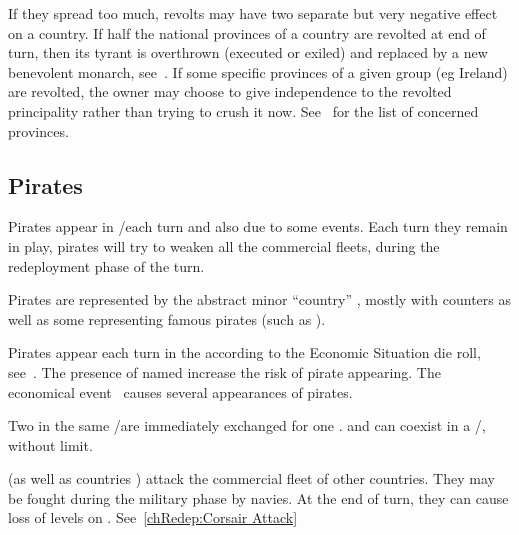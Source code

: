  If they spread too much, revolts may have two
separate but very negative effect on a country.
\bparag If half the national provinces of a country are revolted at end of
turn, then its tyrant is overthrown (executed or exiled) and replaced by a new
benevolent monarch, see~.
\bparag If some specific provinces of a given group (eg Ireland) are revolted,
the owner may choose to give independence to the revolted principality rather
than trying to crush it now. See~ for the list of concerned provinces.



\subsection{Pirates}

Pirates appear in \STZ/\CTZ each turn and also due to some events. Each turn
they remain in play, pirates will try to weaken all the commercial fleets,
during the redeployment phase of the turn.

Pirates are represented by the abstract minor ``country'' ,
mostly with \corsaire counters as well as some \LeaderP representing famous
pirates (such as \leaderBlackbeard).

 Pirates appear each turn in the \ROTW \STZ
according to the Economic Situation die roll, see~.
\bparag The presence of named  \LeaderP increase the risk of
pirate appearing.
\bparag The economical event~ causes several appearances
of pirates.

 Two  \corsaire\facemoins in the
same \STZ/\CTZ are immediately exchanged for one 
\corsaire\faceplus.  \corsaire\faceplus and \Facemoins can
coexist in a \STZ/\CTZ, without limit.


  \corsaire (as well as countries
\corsaire) attack the commercial fleet of other countries.
\bparag They may be fought during the military phase by navies.
\bparag At the end of turn, they can cause loss of levels on \TradeFLEET.
\bparag See~\ref{chRedep:Corsair Attack}




